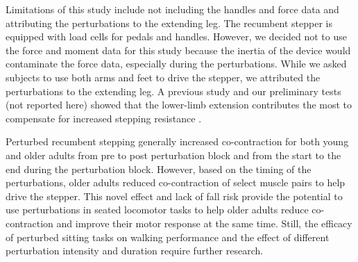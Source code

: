 \documentclass[../thesis_seyed.tex]{subfiles}
\begin{document}
Limitations of this study include not including the handles and force data and attributing the perturbations to the extending leg. The recumbent stepper is equipped with load cells for pedals and handles. However, we decided not to use the force and moment data for this study because the inertia of the device would contaminate the force data, especially during the perturbations. While we asked subjects to use both arms and feet to drive the stepper, we attributed the perturbations to the extending leg. A previous study and our preliminary tests (not reported here) showed that the lower-limb extension contributes the most to compensate for increased stepping resistance \cite{Skinner2014-cl}.

Perturbed recumbent stepping generally increased co-contraction for both young and older adults from pre to post perturbation block and from the start to the end during the perturbation block. However, based on the timing of the perturbations, older adults reduced co-contraction of select muscle pairs to help drive the stepper. This novel effect and lack of fall risk provide the potential to use perturbations in seated locomotor tasks to help older adults reduce co-contraction and improve their motor response at the same time. Still, the efficacy of perturbed sitting tasks on walking performance and the effect of different perturbation intensity and duration require further research.





\newpage
\end{document}
